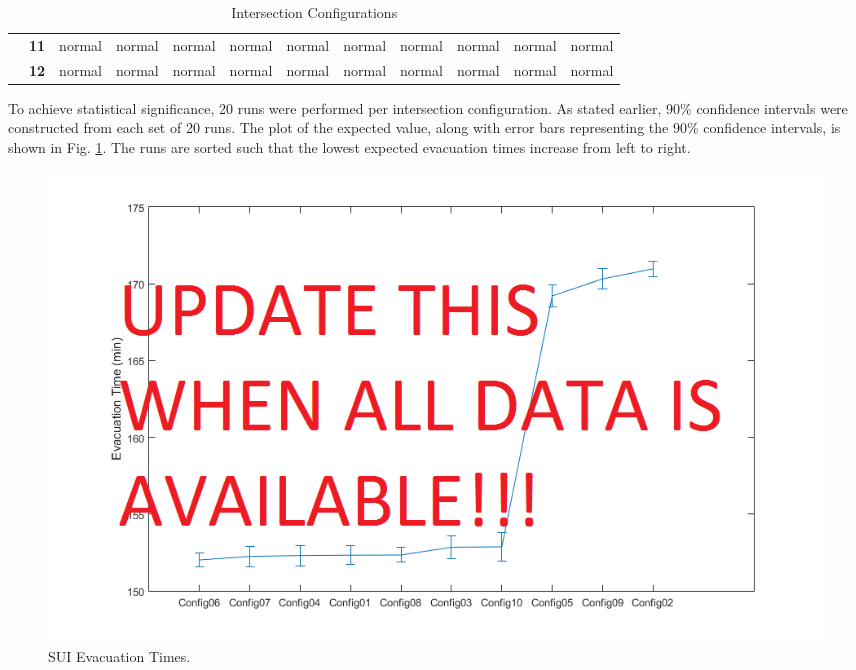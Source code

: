 \documentclass[12pt]{article}
\begin{document}
\begin{table}[]
{\begin{tabular}{clllllllllll}
			\multicolumn{1}{c|}{}                                   & \multicolumn{1}{l|}{\textbf{11}} & \multicolumn{1}{l|}{\cellcolor[HTML]{FFFC9E}normal} & \multicolumn{1}{l|}{\cellcolor[HTML]{FFFC9E}normal} & \multicolumn{1}{l|}{\cellcolor[HTML]{FFFC9E}normal} & \multicolumn{1}{l|}{\cellcolor[HTML]{FFFC9E}normal} & \multicolumn{1}{l|}{\cellcolor[HTML]{FFFC9E}normal} & \multicolumn{1}{l|}{\cellcolor[HTML]{FFFC9E}normal} & \multicolumn{1}{l|}{\cellcolor[HTML]{FFFC9E}normal} & \multicolumn{1}{l|}{\cellcolor[HTML]{FFFC9E}normal} & \multicolumn{1}{l|}{\cellcolor[HTML]{FFFC9E}normal} & \multicolumn{1}{l|}{\cellcolor[HTML]{FFFC9E}normal} \\ \cline{2-12} 
			\multicolumn{1}{c|}{\multirow{-12}{*}{\rotatebox{90}{Intersection ID}}} & \multicolumn{1}{l|}{\textbf{12}} & \multicolumn{1}{l|}{\cellcolor[HTML]{FFFC9E}normal} & \multicolumn{1}{l|}{\cellcolor[HTML]{FFFC9E}normal} & \multicolumn{1}{l|}{\cellcolor[HTML]{FFFC9E}normal} & \multicolumn{1}{l|}{\cellcolor[HTML]{FFFC9E}normal} & \multicolumn{1}{l|}{\cellcolor[HTML]{FFFC9E}normal} & \multicolumn{1}{l|}{\cellcolor[HTML]{FFFC9E}normal} & \multicolumn{1}{l|}{\cellcolor[HTML]{FFFC9E}normal} & \multicolumn{1}{l|}{\cellcolor[HTML]{FFFC9E}normal} & \multicolumn{1}{l|}{\cellcolor[HTML]{FFFC9E}normal} & \multicolumn{1}{l|}{\cellcolor[HTML]{FFFC9E}normal} \\ \cline{2-12} 
		\end{tabular}%
	}
	\caption{Intersection Configurations}
	\label{table:configs}
\end{table}

To achieve statistical significance, 20 runs were performed per intersection
configuration.  As stated earlier, 90\% confidence intervals were constructed
from each set of 20 runs.  The plot of the expected value, along with error
bars representing the 90\% confidence intervals, is shown in Fig.
\ref{fig:evacuationtimes}.  The runs are sorted such that the lowest expected
evacuation times increase from left to right.

\begin{figure}[H]
  \includegraphics[width=\linewidth,natwidth=957,natheight=578]{EvacuationTimes.png}
  \caption{SUI Evacuation Times.}
  \label{fig:evacuationtimes}
\end{figure}
\end{document}
